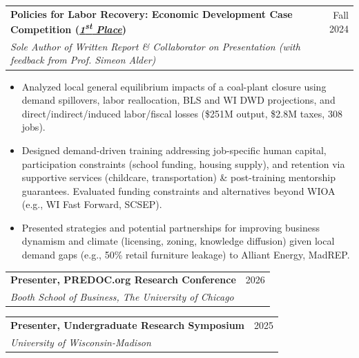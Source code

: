 \documentclass[letterpaper,11pt]{article}
\makeatletter
\newcommand{\resumeItem}[1]{\item\small{{#1 \vspace{-2pt}}}}
\newcommand{\resumeSubheading}[4]{\vspace{-2pt}\item
  \begin{tabular*}{0.97\textwidth}[t]{l@{\extracolsep{\fill}}r}
    \textbf{#1} & #2 \\
    \textit{\small#3} & \textit{\small #4} \\
  \end{tabular*}\vspace{-7pt}}
\newcommand{\resumeItemListStart}{\begin{itemize}}
\newcommand{\resumeItemListEnd}{\end{itemize}\vspace{-5pt}}
\makeatother
\begin{document}
\vspace{0.5mm}

    \resumeSubheading{Policies for Labor Recovery: Economic Development Case Competition (\textit{\underline{1\textsuperscript{st} Place}})}{Fall 2024}{Sole Author of Written Report \& Collaborator on Presentation (with feedback from Prof. Simeon Alder)}{}
    \resumeItemListStart
        
        \resumeItem{Analyzed local general equilibrium impacts of a coal-plant closure using demand spillovers, labor reallocation, BLS and WI DWD projections, and direct/indirect/induced labor/fiscal losses  (\$251M output, \$2.8M taxes, 308 jobs).}
        
        \resumeItem{Designed demand-driven training addressing job-specific human capital, participation constraints (school funding, housing supply), and retention via supportive services (childcare, transportation) \& post-training mentorship guarantees. Evaluated funding constraints and alternatives beyond WIOA (e.g., WI Fast Forward, SCSEP).}
        
        \resumeItem{Presented strategies and potential partnerships for improving business dynamism and climate (licensing, zoning, knowledge diffusion) given local demand gaps (e.g., 50\% retail furniture leakage) to Alliant Energy, MadREP.}
        
    \resumeItemListEnd

\resumeSubheading{Presenter, \textnormal{PREDOC.org Research Conference}}{2026}{Booth School of Business, The University of Chicago}{}

\vspace{1mm}

\resumeSubheading{Presenter, \textnormal{Undergraduate Research Symposium}}{2025}{University of Wisconsin-Madison}{}

\vspace{2.5mm}

\vspace{-1mm}
\end{document}
